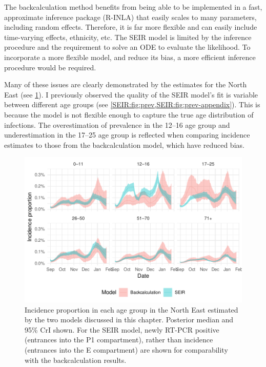 \documentclass[thesis.tex]{subfiles}
\begin{document}
The backcalculation method benefits from being able to be implemented in a fast, approximate inference package (R-INLA) that easily scales to many parameters, including random effects.
Therefore, it is far more flexible and can easily include time-varying effects, ethnicity, etc.
The SEIR model is limited by the inference procedure and the requirement to solve an ODE to evaluate the likelihood.
To incorporate a more flexible model, and reduce its bias, a more efficient inference procedure would be required.

Many of these issues are clearly demonstrated by the estimates for the North East (see \cref{transmission:fig:compare-NE}).
I previously observed the quality of the SEIR model's fit is variable between different age groups (see \cref{SEIR:fig:prev,SEIR:fig:prev-appendix}).
This is because the model is not flexible enough to capture the true age distribution of infections.
The overestimation of prevalence in the 12--16 age group and underestimation in the 17--25 age group is reflected when comparing incidence estimates to those from the backcalculation model, which have reduced bias.
\begin{figure}
    \centering \includegraphics{transmission/compare-NE}
    \caption[Comparing each models estimate of North East incidence proportion by age.]{%
        Incidence proportion in each age group in the North East estimated by the two models discussed in this chapter.
        Posterior median and 95\% CrI shown.
        For the SEIR model, newly RT-PCR positive (entrances into the P1 compartment), rather than incidence (entrances into the E compartment) are shown for comparability with the backcalculation results.
    }
    \label{transmission:fig:compare-NE}
\end{figure}
\end{document}
